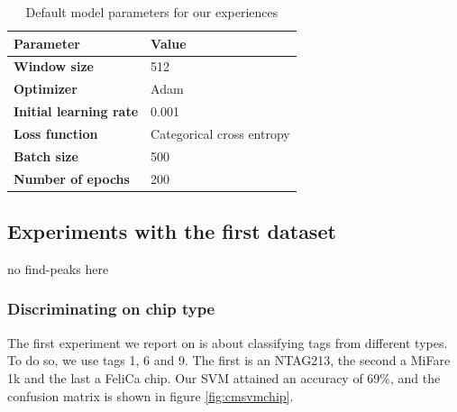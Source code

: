 \begin{table}[htbp!]
  \centering
  \begin{tabular}{|l|l|}
    \hline
    \textbf{Parameter}             & \textbf{Value}            \\ \hline \hline
    \textbf{Window size}           & 512                       \\ \hline
    \textbf{Optimizer}             & Adam                      \\ \hline
    \textbf{Initial learning rate} & 0.001                     \\ \hline
    \textbf{Loss function}         & Categorical cross entropy \\ \hline
    \textbf{Batch size}            & 500                       \\ \hline
    \textbf{Number of epochs}      & 200                       \\ \hline
  \end{tabular}
  \caption{Default model parameters for our experiences}
  \label{tab:parameters}
\end{table}

\subsection{Experiments with the first dataset}

no  find-peaks here

\subsubsection{Discriminating on chip type}

The first experiment we report on is about classifying tags from different types. To do so, we use tags 1, 6 and 9. The first is an NTAG213, the second a MiFare 1k and the last a FeliCa chip. Our SVM attained an accuracy of 69\%, and the confusion matrix is shown in figure \ref{fig:cmsvmchip}.

